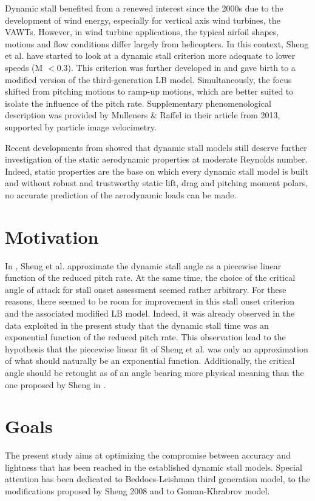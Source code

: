 Dynamic stall  benefited from a renewed interest since the 2000s due to the development of wind energy, especially for vertical axis wind turbines, the VAWTs. However, in wind turbine applications, the typical airfoil shapes, motions and flow conditions differ largely from helicopters. In this context, Sheng et al. have started to look at a dynamic stall criterion more adequate to lower speeds (M $<0.3$). This criterion was further developed in \cite{sheng_modified_2008} and gave birth to a modified version of the third-generation LB model. Simultaneously, the focus shifted from pitching motions to ramp-up motions, which are better suited to isolate the influence of the pitch rate. Supplementary phenomenological description was provided by Mulleners \& Raffel in their article \cite{mulleners_dynamic_2013} from 2013, supported by particle image velocimetry. 

Recent developments from \cite{tank_possibility_2017} showed that dynamic stall models still deserve further investigation of the static aerodynamic properties at moderate Reynolds number. Indeed, static properties are the base on which every dynamic stall model is built and without robust and trustworthy static lift, drag and pitching moment polars, no accurate prediction of the aerodynamic loads can be made. 

\section{Motivation}

In \cite{sheng_modified_2008}, Sheng et al. approximate the dynamic stall angle as a piecewise linear function of the reduced pitch rate. At the same time, the choice of the critical angle of attack for stall onset assessment seemed rather arbitrary. For these reasons, there seemed to be room for improvement in this stall onset criterion and the associated modified LB model. 
Indeed, it was already observed in the data exploited in the present study that the dynamic stall time was an exponential function of the reduced pitch rate. This observation lead to the hypothesis that the piecewise linear fit of Sheng et al. was only an approximation of what should naturally be an exponential function. Additionally, the critical angle should be retought as of an angle bearing more physical meaning than the one proposed by Sheng in \cite{sheng_modified_2008}.
\section{Goals}

The present study aims at optimizing the compromise between accuracy and lightness that has been reached in the established dynamic stall models. Special attention has been dedicated to Beddoes-Leishman third generation model, to the modifications proposed by Sheng 2008 and to Goman-Khrabrov model. 